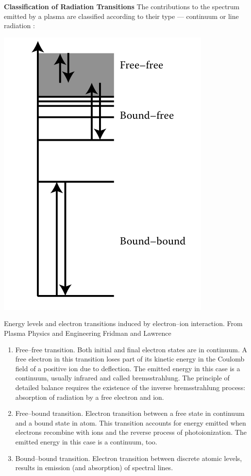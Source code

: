 \documentclass[../main.tex]{subfiles}
\begin{document}
\textbf{Classification of Radiation Transitions}
The contributions to the spectrum emitted by a plasma are classified according to their type --- continuum or line radiation \cite{Thorne1988Spectrophysics}:
\begin{marginfigure}
    \includegraphics[width=\marginparwidth]{figures/electron-transitions.png}
    \label{fig:electron-transitions}
    \caption{Energy levels and electron transitions induced by electron--ion interaction. From Plasma Physics and Engineering Fridman and Lawrence}
\end{marginfigure}
\begin{enumerate}
    \item Free--free transition. Both initial and final electron states are in continuum. A free electron in this transition loses part of its kinetic energy in the Coulomb field of a positive ion due to deflection. The emitted energy in this case is a continuum, usually infrared and called bremsstrahlung. The principle of detailed balance requires the existence of the inverse bremsstrahlung process: absorption of radiation by a free electron and ion.
    \item Free--bound transition. Electron transition between a free state in continuum and a bound state in atom. This transition accounts for energy emitted when electrons recombine with ions and the reverse process of photoionization. The emitted energy in this case is a continuum, too.
    \item Bound--bound transition. Electron transition between discrete atomic levels, results in emission (and absorption) of spectral lines. %
\end{enumerate}
\end{document}
